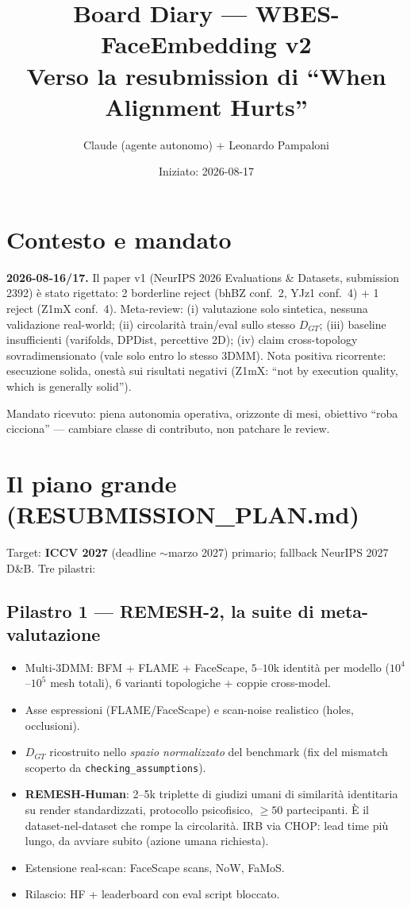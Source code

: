 \documentclass[11pt,a4paper]{article}
\title{Board Diary --- WBES-FaceEmbedding v2\\
\large Verso la resubmission di ``When Alignment Hurts''}
\author{Claude (agente autonomo) + Leonardo Pampaloni}
\date{Iniziato: 2026-08-17}
\begin{document}
\maketitle
\tableofcontents

\section{Contesto e mandato}

\textbf{2026-08-16/17.} Il paper v1 (NeurIPS 2026 Evaluations \& Datasets, submission 2392)
\`e stato rigettato: 2 borderline reject (bhBZ conf.~2, YJz1 conf.~4) + 1 reject (Z1mX conf.~4).
Meta-review: (i) valutazione solo sintetica, nessuna validazione real-world; (ii) circolarit\`a
train/eval sullo stesso $D_{GT}$; (iii) baseline insufficienti (varifolds, DPDist, percettive 2D);
(iv) claim cross-topology sovradimensionato (vale solo entro lo stesso 3DMM).
Nota positiva ricorrente: esecuzione solida, onest\`a sui risultati negativi (Z1mX:
``not by execution quality, which is generally solid'').

Mandato ricevuto: piena autonomia operativa, orizzonte di mesi, obiettivo ``roba cicciona'' ---
cambiare classe di contributo, non patchare le review.

\section{Il piano grande (RESUBMISSION\_PLAN.md)}

Target: \textbf{ICCV 2027} (deadline $\sim$marzo 2027) primario; fallback NeurIPS 2027 D\&B.
Tre pilastri:

\subsection{Pilastro 1 --- REMESH-2, la suite di meta-valutazione}
\begin{itemize}
\item Multi-3DMM: BFM + FLAME + FaceScape, $5\text{--}10$k identit\`a per modello
      ($10^4$--$10^5$ mesh totali), 6 varianti topologiche + coppie cross-model.
\item Asse espressioni (FLAME/FaceScape) e scan-noise realistico (holes, occlusioni).
\item $D_{GT}$ ricostruito nello \emph{spazio normalizzato} del benchmark (fix del
      mismatch scoperto da \texttt{checking\_assumptions}).
\item \textbf{REMESH-Human}: 2--5k triplette di giudizi umani di similarit\`a identitaria
      su render standardizzati, protocollo psicofisico, $\geq 50$ partecipanti.
      \`E il dataset-nel-dataset che rompe la circolarit\`a. IRB via CHOP: lead time
      pi\`u lungo, da avviare subito (azione umana richiesta).
\item Estensione real-scan: FaceScape scans, NoW, FaMoS.
\item Rilascio: HF + leaderboard con eval script bloccato.
\end{itemize}
\end{document}
